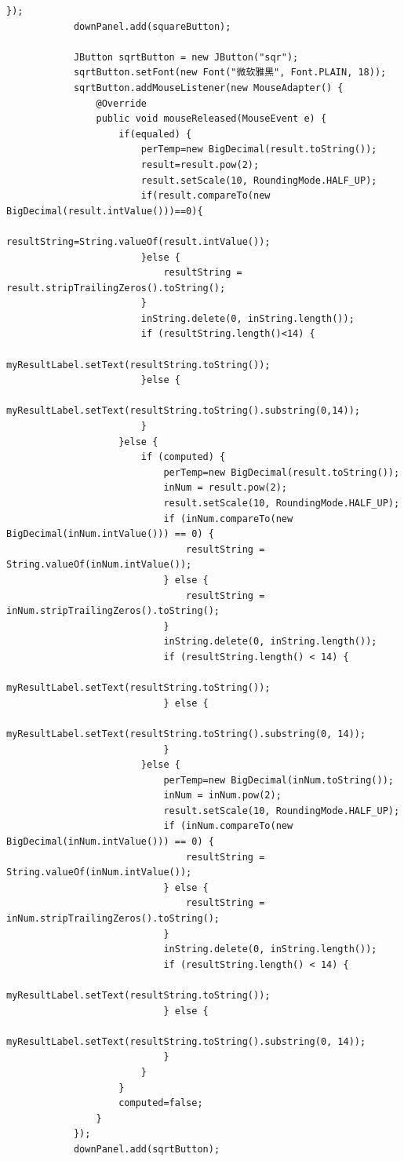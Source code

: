 \documentclass{ctexart}
\begin{document}
\begin{lstlisting}[caption=冗杂的代码]
            });
            downPanel.add(squareButton);
            
            JButton sqrtButton = new JButton("sqr");
            sqrtButton.setFont(new Font("微软雅黑", Font.PLAIN, 18));
            sqrtButton.addMouseListener(new MouseAdapter() {
                @Override
                public void mouseReleased(MouseEvent e) {
                    if(equaled) {
                        perTemp=new BigDecimal(result.toString());
                        result=result.pow(2);
                        result.setScale(10, RoundingMode.HALF_UP);
                        if(result.compareTo(new BigDecimal(result.intValue()))==0){
                            resultString=String.valueOf(result.intValue());
                        }else {
                            resultString = result.stripTrailingZeros().toString();
                        }
                        inString.delete(0, inString.length());
                        if (resultString.length()<14) {
                            myResultLabel.setText(resultString.toString());
                        }else {
                            myResultLabel.setText(resultString.toString().substring(0,14));
                        }
                    }else {
                        if (computed) {
                            perTemp=new BigDecimal(result.toString());
                            inNum = result.pow(2);
                            result.setScale(10, RoundingMode.HALF_UP);
                            if (inNum.compareTo(new BigDecimal(inNum.intValue())) == 0) {
                                resultString = String.valueOf(inNum.intValue());
                            } else {
                                resultString = inNum.stripTrailingZeros().toString();
                            }
                            inString.delete(0, inString.length());
                            if (resultString.length() < 14) {
                                myResultLabel.setText(resultString.toString());
                            } else {
                                myResultLabel.setText(resultString.toString().substring(0, 14));
                            } 
                        }else {
                            perTemp=new BigDecimal(inNum.toString());
                            inNum = inNum.pow(2);
                            result.setScale(10, RoundingMode.HALF_UP);
                            if (inNum.compareTo(new BigDecimal(inNum.intValue())) == 0) {
                                resultString = String.valueOf(inNum.intValue());
                            } else {
                                resultString = inNum.stripTrailingZeros().toString();
                            }
                            inString.delete(0, inString.length());
                            if (resultString.length() < 14) {
                                myResultLabel.setText(resultString.toString());
                            } else {
                                myResultLabel.setText(resultString.toString().substring(0, 14));
                            }
                        }
                    }	
                    computed=false;	
                }
            });
            downPanel.add(sqrtButton);
            

\end{lstlisting}
\end{document}
